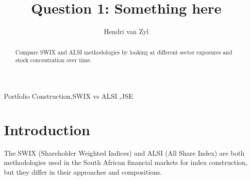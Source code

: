 \documentclass[11pt,preprint, authoryear]{elsarticle}
\numberwithin{equation}{section}
\numberwithin{figure}{section}
\numberwithin{table}{section}
\begin{document}
\begin{frontmatter}  %

\title{Question 1: Something here}





\author[Add1]{Hendri van Zyl}





\address[Add1]{Stellenbosch, South Africa}


\begin{abstract}
\small{
Compare SWIX and ALSI methodologies by looking at different sector
exposures and stock concentration over time.
}
\end{abstract}

\vspace{1cm}


\begin{keyword}
\footnotesize{
Portfolio Construction\sep SWIX vs ALSI \sep JSE \\
\vspace{0.3cm}
}
\end{keyword}



\vspace{0.5cm}

\end{frontmatter}

\setcounter{footnote}{0}



\pagestyle{fancy}
\chead{}
\rhead{}
\lfoot{}
\lhead{}
\cfoot{}


\headsep 35pt %




\hypertarget{introduction}{%
\section*{Introduction}\label{introduction}}

The SWIX (Shareholder Weighted Indices) and ALSI (All Share Index) are
both methodologies used in the South African financial markets for index
construction, but they differ in their approaches and compositions.
\end{document}
